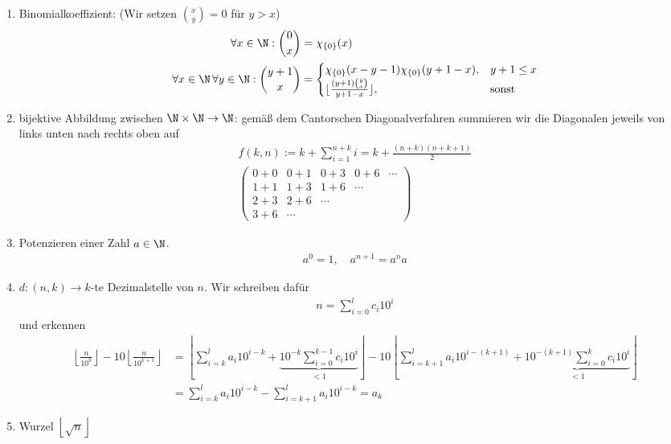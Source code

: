 \begin{solution}
\begin{enumerate}
		\item Binomialkoeffizient: (Wir setzen $\binom{x}{y} = 0$ für $y > x$)
		\begin{align*}
			\forall x \in \N: \binom{0}{x} &= \chi_{\{0\}}(x) \\
			\forall x \in \N\,\forall y \in \N: \binom{y+1}{x} &= \begin{cases}
				\chi_{\{0\}}(x-y-1)\chi_{\{0\}}(y+1-x), & y+1 \leq x \\
				\lfloor\frac{(y+1)\binom{y}{x}}{y+1-x}\rfloor, & \text{sonst}
			\end{cases}
		\end{align*}
		\item bijektive Abbildung zwischen $\N \times \N \to \N$: gemäß dem Cantorschen Diagonalverfahren summieren wir die Diagonalen jeweils von links unten nach rechts oben auf
			\begin{align*}
			f(k,n) := k + \sum_{i = 1}^{n + k} i = k + \frac{(n + k) (n + k + 1)}{2} \\
			\begin{pmatrix}
				0 + 0 & 0 + 1 & 0 + 3 & 0 + 6 & \cdots \\
				1 + 1 & 1 + 3 & 1 + 6 & \cdots & \\
				2 + 3 & 2 + 6 & \cdots & & \\
				3 + 6 & \cdots &&&
			\end{pmatrix}
			\end{align*}
		\item Potenzieren einer Zahl $a \in \N$.
			\begin{align*}
			a^0 = 1, \quad a^{n + 1} = a^n a
			\end{align*}
		\item $d:(n,k) \to k$-te Dezimalstelle von $n$. Wir schreiben dafür
			\begin{align*}
			n = \sum_{i = 0}^l c_i 10^i
			\end{align*}
		und erkennen
			\begin{align*}
			\left\lfloor \frac{n}{10^k} \right\rfloor - 10 \left\lfloor \frac{n}{10^{k + 1}} \right\rfloor &=  \left\lfloor \sum_{i = k}^l a_i 10^{i - k} + \underbrace{10^{-k} \sum_{i = 0}^{k - 1} c_i 10^i}_{< 1} \right\rfloor - 10 \left\lfloor \sum_{i = k + 1}^l a_i 10^{i - (k + 1)} + \underbrace{10^{-(k + 1)} \sum_{i = 0}^{k} c_i 10^i}_{< 1} \right\rfloor \\
			&= \sum_{i = k}^l a_i 10^{i - k} - \sum_{i = k + 1}^l a_i 10^{i - k} = a_k
			\end{align*}
		\item Wurzel $\left\lfloor \sqrt{n} \right \rfloor$

\end{enumerate}
\end{solution}
